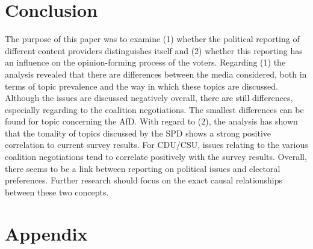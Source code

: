 \documentclass[12pt,a4paper,notitlepage]{article}
\begin{document}
\section{Conclusion}

The purpose of this paper was to examine (1) whether the political reporting of different content providers distinguishes itself and (2) whether this reporting has an influence on the opinion-forming process of the voters. Regarding (1) the analysis revealed that there are differences between the media considered, both in terms of topic prevalence and the way in which these topics are discussed. Although the issues are discussed negatively overall, there are still differences, especially regarding to the coalition negotiations. The smallest differences can be found for topic concerning the AfD. With regard to (2), the analysis has shown that the tonality of topics discussed by the SPD shows a strong positive correlation to current survey results. For CDU/CSU, issues relating to the various coalition negotiations tend to correlate positively with the survey results.  Overall, there seems to be a link between reporting on political issues and electoral preferences. Further research should focus on the exact causal relationships between these two concepts. 

\section*{Appendix}
\end{document}
